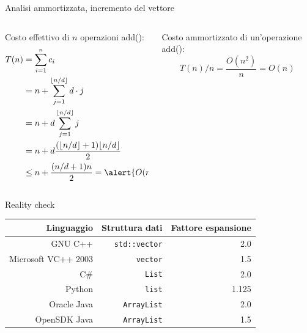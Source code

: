\begin{frame}{Analisi ammortizzata, incremento del vettore}
	
\begin{columns}[T]
\begin{column}{0.57\textwidth}
\alert{Costo effettivo di $n$ operazioni \textsf{add}()}:
\begin{align*}
  T(n) &= \sum_{i=1}^{n} c_i \\
    &= n + \sum_{j=1}^{\lfloor n/d \rfloor} d \cdot j \\
    &= n + d\sum_{j=1}^{\lfloor n/d \rfloor} j \\
    &= n + d \frac{(\lfloor n/d \rfloor+1)\lfloor n/d \rfloor}{2} \\
    &\leq n + \frac{(n/d+1)n}{2} =  \alert{O(n^2)}
\end{align*}
\end{column}
\begin{column}{0.43\textwidth}
\alert{Costo ammortizzato di un'operazione \textsf{add}()}: \[ T(n)/n = \frac{O(n^2)}{n} = O(n)\]
\end{column}
\end{columns}

\end{frame}

\begin{frame}{Reality check}

\begin{center}
\begin{tabular}{|r|r|r|}
\hline
\textbf{Linguaggio} & \textbf{Struttura dati} & \textbf{Fattore espansione} \\
\hline
GNU C++ & \texttt{std::vector} & 2.0 \\
\hline
Microsoft VC++ 2003 & \texttt{vector} & 1.5 \\
\hline
C\# & \texttt{List} & 2.0 \\
\hline
Python & \texttt{list} & 1.125 \\
\hline
Oracle Java & \texttt{ArrayList} & 2.0 \\
\hline
OpenSDK Java & \texttt{ArrayList} & 1.5 \\
\hline
\end{tabular}
\end{center}

\end{frame}

